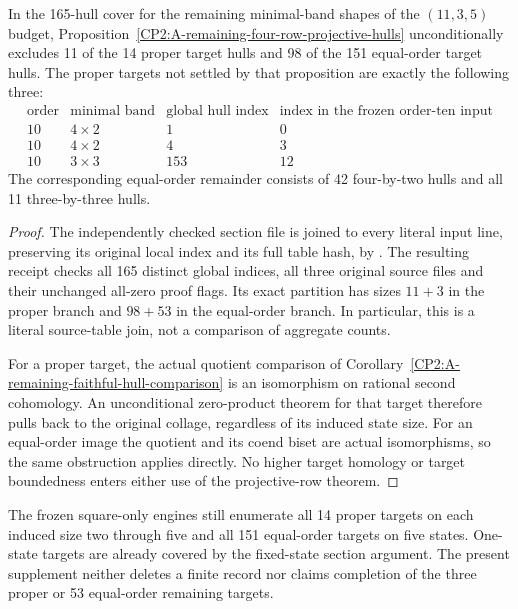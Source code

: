 \begin{corollary}
\label{CP2:A-remaining-hull-projectivity-scope}
In the 165-hull cover for the remaining minimal-band shapes of
the $(11,3,5)$ budget, Proposition~\ref{CP2:A-remaining-four-row-projective-hulls}
unconditionally excludes 11 of the 14 proper target hulls and
98 of the 151 equal-order target hulls.  The proper targets not
settled by that proposition are exactly the following three:
\[
\begin{array}{c|c|c|c}
 \text{order}&\text{minimal band}&\text{global hull index}&
 \text{index in the frozen order-ten input}\\\hline
 10&4\times2&1&0\\
 10&4\times2&4&3\\
 10&3\times3&153&12
\end{array}
\]
The corresponding equal-order remainder consists of 42
four-by-two hulls and all 11 three-by-three hulls.
\end{corollary}
\begin{proof}
The independently checked section file is joined to every literal
input line, preserving its original local index and its full
table hash, by
.
The resulting receipt
checks all 165 distinct global indices, all three original source
files and their unchanged all-zero proof flags.  Its exact
partition has sizes $11+3$ in the proper branch and $98+53$ in
the equal-order branch.  In particular, this is a literal
source-table join, not a comparison of aggregate counts.

For a proper target, the actual quotient comparison of
Corollary~\ref{CP2:A-remaining-faithful-hull-comparison} is an
isomorphism on rational second cohomology.  An unconditional
zero-product theorem for that target therefore pulls back to
the original collage, regardless of its induced state size.
For an equal-order image the quotient and its coend biset are
actual isomorphisms, so the same obstruction applies directly.
No higher target homology or target boundedness enters either
use of the projective-row theorem.
\end{proof}

\begin{remark*}
The frozen square-only engines still enumerate all 14 proper
targets on each induced size two through five and all 151
equal-order targets on five states.  One-state targets are
already covered by the fixed-state section argument.  The
present supplement neither deletes a finite record nor claims
completion of the three proper or 53 equal-order remaining
targets.
\end{remark*}

